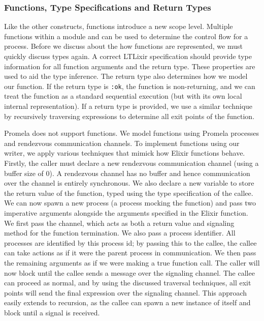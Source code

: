 \subsubsection{Functions, Type Specifications and Return Types}
Like the other constructs, functions introduce a new scope level. Multiple functions within a module and can be used to determine the control flow for a process. Before we discuss about the how functions are represented, we must quickly discuss types again. A correct LTLixir specification should provide type information for all function arguments and the return type. These properties are used to aid the type inference. The return type also determines how we model our function. If the return type is \texttt{:ok}, the function is non-returning, and we can treat the function as a standard sequential execution (but with its own local internal representation). If a return type is provided, we use a similar technique by recursively traversing expressions to determine all exit points of the function. 
\par
Promela does not support functions. We model functions using Promela processes and rendezvous communication channels. To implement functions using our writer, we apply various techniques that mimick how Elixir functions behave. Firstly, the caller must declare a new rendezvous communication channel (using a buffer size of 0). A rendezvous channel has no buffer and hence communication over the channel is entirely synchronous. We also declare a new variable to store the return value of the function, typed using the type specification of the callee. We can now spawn a new process (a process mocking the function) and pass two imperative arguments alongside the arguments specified in the Elixir function. We first pass the channel, which acts as both a return value and signaling method for the function termination. We also pass a process identifier. All processes are identified by this process id; by passing this to the callee, the callee can take actions as if it were the parent process in communication. We then pass the remaining arguments as if we were making a true function call. The caller will now block until the callee sends a message over the signaling channel. The callee can proceed as normal, and by using the discussed traversal techniques, all exit points will send the final expression over the signaling channel. This approach easily extends to recursion, as the callee can spawn a new instance of itself and block until a signal is received.
\par 
